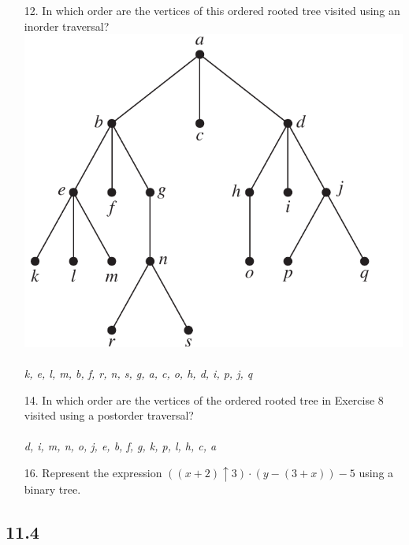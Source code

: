 \begin{itemize}
    \item[12.]  In which order are the vertices of this ordered rooted tree
          visited using an inorder traversal? \\
          \includegraphics[scale=0.6]{img/11_3_12_tree.png} \\
          \answer \\
         \textit{k, e, l, m, b, f, r, n, s, g, a, c, o, h, d, i, p, j, q}

    \item[14.] In which order are the vertices of the ordered rooted tree
in Exercise 8 visited using a postorder traversal?\\
\answer \\
\textit{d, i, m, n, o, j, e, b, f, g, k, p, l, h, c, a}

\item[16.] Represent the expression
 $((x + 2) \uparrow 3) \cdot (y -(3 + x)) - 5$ using a binary tree.



\end{itemize}

\subsection{11.4}
